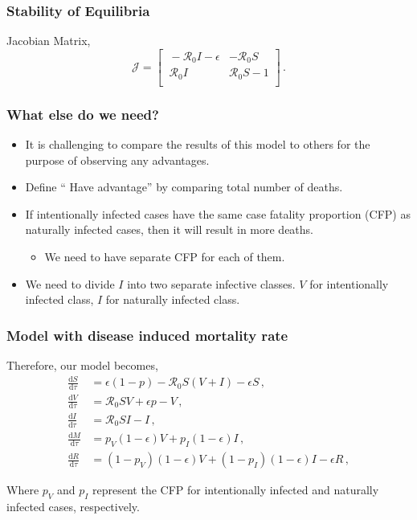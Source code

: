 \documentclass[12pt]{beamer}
\newcommand\dbyd[2]{\frac{\mathrm d{#1}}{\mathrm d{#2}}}
\newcommand{\R}{\mathcal{R}}
\newcommand{\pmV}{p_{V}}
\newcommand{\pmI}{p_{I}}
\begin{document}
\begin{frame}
\frametitle{Stability of Equilibria}

Jacobian Matrix,
\pause
\begin{equation}
\mathcal{J} =
\begin{bmatrix}
    \ -\R_0 I-\epsilon       & -\R_0 S \\
    \ \R_0 I       & \R_0 S-1 \\
\end{bmatrix} \,.
\end{equation}
\end{frame}
\begin{frame}
\frametitle{What else do we need?}
\pause
\begin{itemize}\itemsep10pt
\item It is challenging to compare the results of this model to others for the purpose of observing any advantages.
\pause
\item Define `` Have advantage'' by comparing total number of deaths.
\pause
\item If intentionally infected cases have the same case fatality proportion (CFP) as naturally infected cases, then it will result in more deaths.
\begin{itemize}
\item We need to have separate CFP for each of them.
\end{itemize}
\pause
\item We need to divide $I$ into two separate infective classes. $V$ for intentionally infected class, $I$ for naturally infected class.
\end{itemize}
\end{frame}
\begin{frame}
\frametitle{Model with disease induced mortality rate}

Therefore, our model becomes,
\begin{subequations}\label{eq:base_ODE}
\begin{align}
\dbyd{S}{\tau}&=\epsilon(1-p)- \R_0 S(V+I)-\epsilon S\,, \label{eq:S_by_tau}\\
\dbyd{V}{\tau}&=\R_0 SV+\epsilon p-V\,, \label{eq:V_by_tau}\\
\dbyd{I}{\tau}&=\R_0 SI-I\,, \label{eq:I_by_tau}\\
\dbyd{M}{\tau}&=\pmV(1-\epsilon) V+\pmI(1-\epsilon) I\,,\\
\dbyd{R}{\tau}&=(1-\pmV)(1-\epsilon) V+(1-\pmI)(1-\epsilon) I-\epsilon R\,,
\end{align}
\end{subequations}

Where $\pmV$ and $\pmI$ represent the CFP for intentionally infected and naturally infected cases, respectively.
\end{frame}
\end{document}
